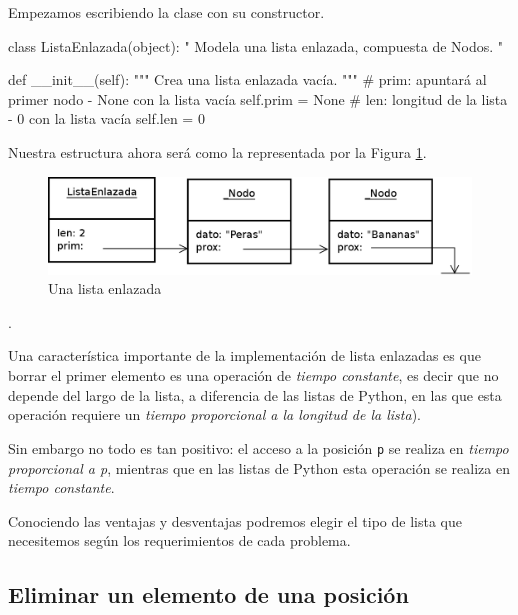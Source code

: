 Empezamos escribiendo la clase con su constructor.

\begin{codigo-python-sn}
class ListaEnlazada(object):
    " Modela una lista enlazada, compuesta de Nodos. "

    def __init__(self):
        """ Crea una lista enlazada vacía. """
        # prim: apuntará al primer nodo - None con la lista vacía
        self.prim = None
        # len: longitud de la lista - 0 con la lista vacía
        self.len = 0
\end{codigo-python-sn}

Nuestra estructura ahora será como la representada por la Figura
\ref{lista_enlazada}.

\begin{figure}[htb]
\label{lista_enlazada}
\includegraphics{graficos/16_ListaEnlazada}
\caption{Una lista enlazada}
\end{figure}

.

\begin{sabias_que}
Una característica importante de la implementación de lista enlazadas es que
borrar el primer elemento es una operación de {\it tiempo constante}, es
decir que no depende del largo de la lista, a diferencia de las listas de
Python, en las que esta operación requiere un {\it tiempo proporcional a la
longitud de la lista}).

Sin embargo no todo es tan positivo: el acceso a la posición {\tt p} se realiza
en {\it tiempo proporcional a p}, mientras que en las listas de Python esta
operación se realiza en {\it tiempo constante}.

Conociendo las ventajas y desventajas podremos elegir el tipo de lista que
necesitemos según los requerimientos de cada problema.
\end{sabias_que}

\subsection{Eliminar un elemento de una posición}

